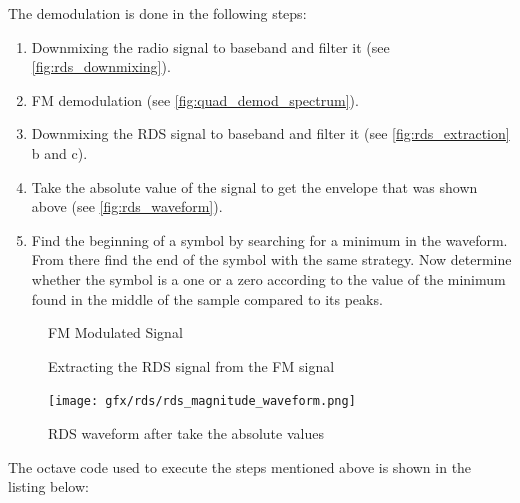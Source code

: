 The demodulation is done in the following steps:
\begin{enumerate}
	\item Downmixing the radio signal to baseband and filter it (see 
		\autoref{fig:rds_downmixing}).
	\item \ac{FM} demodulation (see \autoref{fig:quad_demod_spectrum}).
	\item Downmixing the \ac{RDS} signal to baseband and filter it
		(see \autoref{fig:rds_extraction} b and c).
	\item Take the absolute value of the signal to get the envelope
		that was shown above (see \autoref{fig:rds_waveform}).
	\item Find the beginning of a symbol by searching for a minimum in
		the waveform. From there find the end of the symbol with the
		same strategy. Now determine whether the symbol is a one or a
		zero according to the value of the minimum found in the middle
		of the sample compared to its peaks.
\end{enumerate}

\begin{figure}

\caption{FM Modulated Signal}
\label{fig:rds_downmixing}
\end{figure}


\begin{figure}


\caption{Extracting the RDS signal from the FM signal}
\label{fig:rds_extraction}
\end{figure}

\begin{figure}
	\centering
	\texttt{[image: gfx/rds/rds\_magnitude\_waveform.png]}
	\caption{RDS waveform after take the absolute values}
	\label{fig:rds_waveform}
\end{figure}

The octave code used to execute the steps mentioned above is shown in the
listing below:

